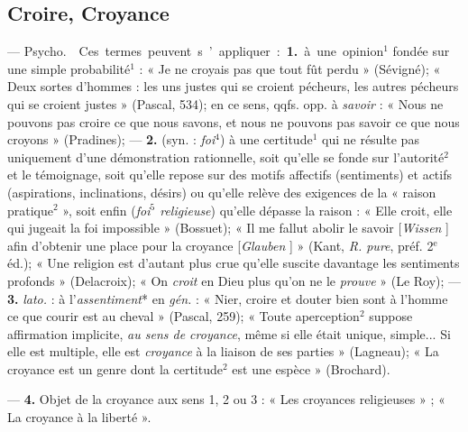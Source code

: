 \subsection{Croire, Croyance}

 — \si{Psycho.}  Ces
termes peuvent s’appliquer : {\bf 1.} à
une opinion$^1$ fondée sur une simple
probabilité$^1$ : « Je ne croyais pas que
tout fût perdu » (Sévigné); « Deux
sortes d'hommes : les uns justes qui
se croient pécheurs, les autres pécheurs qui se croient justes » (Pascal,
534); en ce sens, qqfs. opp. à {\it savoir} :
« Nous ne pouvons pas croire ce que
nous savons, et nous ne pouvons
pas savoir ce que nous croyons »
(Pradines); — {\bf 2.} (syn. : {\it foi}$^4$) à une
certitude$^1$ qui ne résulte pas uniquement d'une démonstration rationnelle, soit qu’elle se fonde sur l’autorité$^2$ et le témoignage, soit qu'elle
repose sur des motifs affectifs (sentiments) et actifs (aspirations, inclinations, désirs) ou qu'elle relève des
exigences de la « raison pratique$^2$ »,
soit enfin ({\it foi$^5$ religieuse}) qu’elle
dépasse la raison : « Elle croit, elle
qui jugeait la foi impossible »
(Bossuet); « Il me fallut abolir le
savoir [{\it Wissen} ] afin d'obtenir une
place pour la croyance [{\it Glauben} ] »
(Kant, {\it R. pure}, préf. 2$^\text{e}$ éd.); « Une
religion est d’autant plus crue qu’elle
suscite davantage les sentiments
profonds » (Delacroix); « On {\it croit} en
Dieu plus qu’on ne le {\it prouve} » (Le
Roy); — {\bf 3.} {\it lato.} : à l'{\it assentiment}* en
 {\it gén.} : « Nier, croire et douter bien
sont à l’homme ce que courir est au
cheval » (Pascal, 259); « Toute aperception$^2$ suppose affirmation implicite, {\it au sens de croyance}, même si
elle était unique, simple... Si elle
est multiple, elle est {\it croyance} à la
liaison de ses parties » (Lagneau);
« La croyance est un genre dont
la certitude$^2$ est une espèce » (Brochard).

— {\bf 4.}  Objet de la croyance aux
sens 1, 2 ou 3 : « Les croyances religieuses » ; « La croyance à la liberté ».

